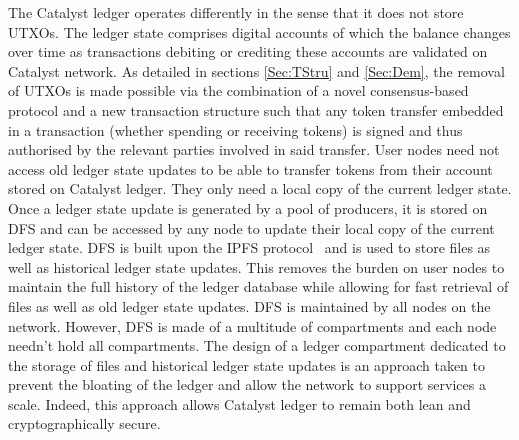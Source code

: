 The Catalyst ledger operates differently in the sense that it does not store UTXOs. The ledger state comprises digital accounts of which the balance changes over time as transactions debiting or crediting these accounts are validated on Catalyst network. As detailed in sections \ref{Sec:TStru} and \ref{Sec:Dem}, the removal of UTXOs is made possible via the combination of a novel consensus-based protocol and a new transaction structure such that any token transfer embedded in a transaction (whether spending or receiving tokens) is signed and thus authorised by the relevant parties involved in said transfer. User nodes need not access old ledger state updates to be able to transfer tokens from their account stored on Catalyst ledger. They only need  a local copy of the current ledger state.\\

Once a ledger state update is generated by a pool of producers, it is stored on DFS and can be accessed by any node to update their local copy of the current ledger state. DFS is built upon the IPFS protocol~\cite{ipfs} and is used to store files as well as historical ledger state updates. This removes the burden on user nodes to maintain the full history of the ledger database while allowing for fast retrieval of files as well as old ledger state updates. DFS is maintained by all nodes on the network. However, DFS is made of a multitude of compartments and each node needn’t hold all compartments. The design of a ledger compartment dedicated to the storage of files and historical ledger state updates  is an approach taken to prevent the bloating of the ledger and allow the network to support services a scale. Indeed, this approach allows Catalyst ledger to remain both lean and cryptographically secure.  
